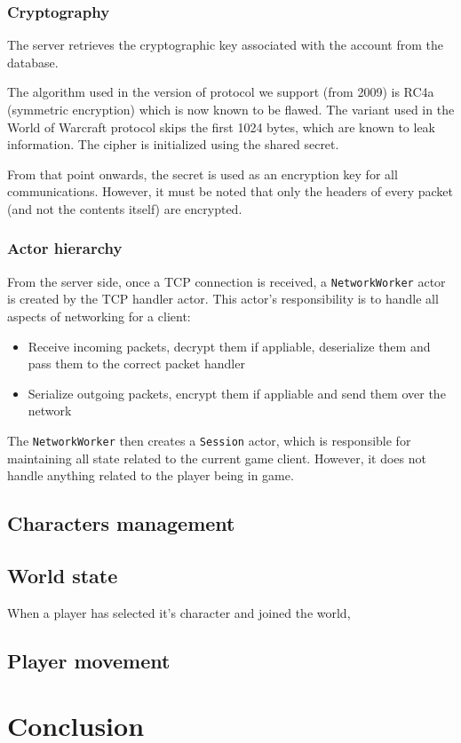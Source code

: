 \documentclass[paper=a4, fontsize=11pt]{scrartcl}
\begin{document}
\subsubsection{Cryptography}

The server retrieves the cryptographic key associated with the account from the
database.

The algorithm used in the version of protocol we support (from
2009) is RC4a (symmetric encryption) which is now known to be flawed.
The variant used in the World of Warcraft protocol skips the first 1024 bytes,
which are known to leak information.
The cipher is initialized using the shared secret.

From that point onwards, the secret is used as an encryption key for all
communications.
However, it must be noted that only the headers of every packet
(and not the contents itself) are encrypted.

\subsubsection{Actor hierarchy}

From the server side, once a TCP connection is received, a
\texttt{NetworkWorker} actor is created by the TCP handler actor.
This actor's responsibility is to handle all aspects of networking for a client:
\begin{itemize}
    \item Receive incoming packets, decrypt them if appliable, deserialize them
        and pass them to the correct packet handler
    \item Serialize outgoing packets, encrypt them if appliable and send them
        over the network
\end{itemize}

The \texttt{NetworkWorker} then creates a \texttt{Session} actor, which is
responsible for maintaining all state related to the current game client.
However, it does not handle anything related to the player being in game.

\subsection{Characters management}

\subsection{World state}

When a player has selected it's character and joined the world,

\subsection{Player movement}

\section{Conclusion}

\end{document}
